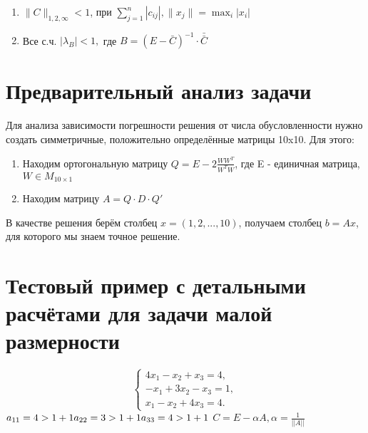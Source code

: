 \documentclass{article}
\begin{document}
	\begin{enumerate}
		\item $\|C\|_{1,2,\infty} < 1$, при $\sum\limits_{j=1}^{n}{|c_{ij}|},\|x_j\| = \max_i{|x_i|}$
		
		\item Все с.ч. $|\lambda_B| < 1,$ где $ B = (E - \bar C )^{-1} \cdot \bar \bar C$
		
	\end{enumerate}
	\section{Предварительный анализ задачи}
	Для анализа зависимости погрешности решения от числа обусловленности нужно создать симметричные, положительно определённые матрицы 10x10. Для этого:
\begin{enumerate}
	\item Находим ортогональную матрицу $Q = E - 2\frac{WW^T}{W^TW}$, где E - единичная матрица, $W \in M_{10 \times 1}$
	\item Находим матрицу $A = Q \cdot D \cdot Q'$
\end{enumerate}
В качестве решения берём столбец $x = (1,2,...,10)$, получаем столбец $b = Ax$, для которого мы знаем точное решение.

	\section{Тестовый пример с детальными расчётами для задачи малой размерности}
		\begin{equation*}
		\begin{cases}
			4x_1 - x_2 + x_3 = 4, 
			\\
			-x_1 +3x_2 -x_3 = 1,
			\\
			x_1 - x_2 +4x_3 = 4.
		\end{cases}
	\end{equation*}
	$
	a_{11} = 4> 1+1
	~\\
	a_{22} = 3> 1+1
	~\\
	a_{33} = 4> 1+1
	$
	$C = E- \alpha A, \alpha = \frac{1}{||A||}$
	
\end{document}
